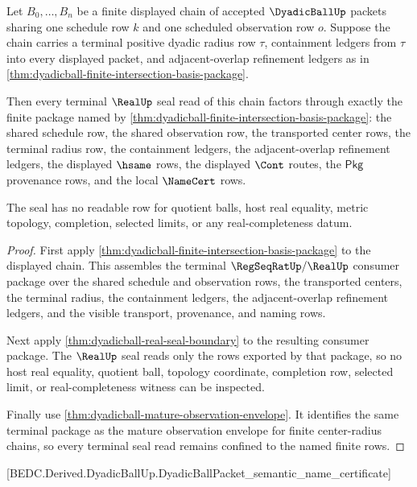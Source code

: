 \begin{theorem}
\label{thm:dyadicball-terminal-real-seal-boundary}
Let $B_0,\ldots,B_n$ be a finite displayed chain of accepted
$\DyadicBallUp$ packets sharing one schedule row $k$ and one scheduled
observation row $o$. Suppose the chain carries a terminal positive dyadic
radius row $\tau$, containment ledgers from $\tau$ into every displayed packet,
and adjacent-overlap refinement ledgers as in
\autoref{thm:dyadicball-finite-intersection-basis-package}.

Then every terminal $\RealUp$ seal read of this chain factors through exactly
the finite package named by
\autoref{thm:dyadicball-finite-intersection-basis-package}: the shared schedule
row, the shared observation row, the transported center rows, the terminal
radius row, the containment ledgers, the adjacent-overlap refinement ledgers,
the displayed $\hsame$ rows, the displayed $\Cont$ routes, the $\mathsf{Pkg}$
provenance rows, and the local $\NameCert$ rows.

The seal has no readable row for quotient balls, host real equality, metric
topology, completion, selected limits, or any real-completeness datum.
\end{theorem}
\begin{proof}
First apply \autoref{thm:dyadicball-finite-intersection-basis-package} to the
displayed chain. This assembles the terminal $\RegSeqRatUp/\RealUp$ consumer
package over the shared schedule and observation rows, the transported centers,
the terminal radius, the containment ledgers, the adjacent-overlap refinement
ledgers, and the visible transport, provenance, and naming rows.

Next apply \autoref{thm:dyadicball-real-seal-boundary} to the resulting
consumer package. The $\RealUp$ seal reads only the rows exported by that
package, so no host real equality, quotient ball, topology coordinate,
completion row, selected limit, or real-completeness witness can be inspected.

Finally use \autoref{thm:dyadicball-mature-observation-envelope}. It identifies
the same terminal package as the mature observation envelope for finite
center-radius chains, so every terminal seal read remains confined to the named
finite rows.
\end{proof}

[BEDC.Derived.DyadicBallUp.DyadicBallPacket\_semantic\_name\_certificate]

